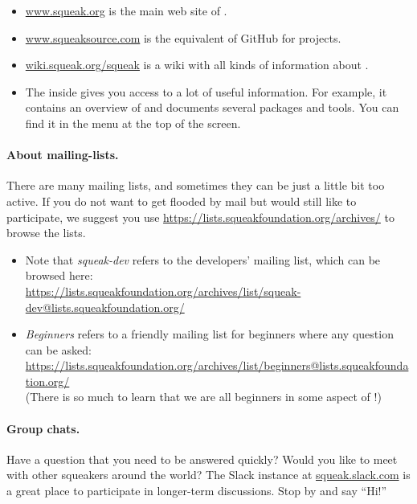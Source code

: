 \documentclass[a4paper,10pt,twoside]{book}
\begin{document}
\begin{itemize}
\item \url{www.squeak.org} is the main web site of \sq.

\item \url{www.squeaksource.com} is the equivalent of GitHub for \sq projects.

\item \url{wiki.squeak.org/squeak} is a wiki with all kinds of information about \sq.

\item The  inside \sq gives you access to a lot of useful information.
For example, it contains an overview of  and documents several packages and tools.
You can find it in the  menu at the top of the screen.
\end{itemize}

\paragraph{About mailing-lists.}
There are many mailing lists, and sometimes they can be just a little bit too active.
If you do not want to get flooded by mail but would still like to participate, we suggest you use \url{https://lists.squeakfoundation.org/archives/} to browse the lists.

\begin{itemize}
\item Note that \emph{squeak-dev} refers to the developers' mailing list, which can be browsed here:\\
\url{https://lists.squeakfoundation.org/archives/list/squeak-dev@lists.squeakfoundation.org/}
\item \emph{Beginners} refers to a friendly mailing list for beginners where any question can be asked:\\
\url{https://lists.squeakfoundation.org/archives/list/beginners@lists.squeakfoundation.org/}\\
(There is so much to learn that we are all beginners in some aspect of \sq!)
\end{itemize}

\paragraph{Group chats.}
Have a question that you need to be answered quickly?
Would you like to meet with other squeakers around the world?
The Slack instance at \url{squeak.slack.com} is a great place to participate in longer-term discussions.
Stop by and say ``Hi!''
\end{document}
